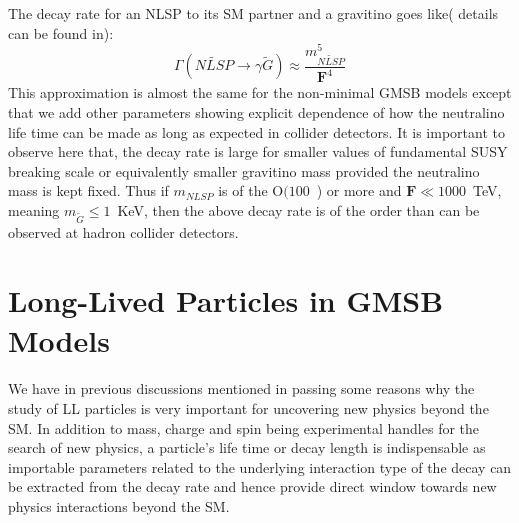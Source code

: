 {The decay rate for an NLSP to its SM partner and a gravitino goes like( details can be found in\cite{SM,GU}):
\begin{equation}\label{drate}
\Gamma(\tilde{NLSP} \rightarrow \gamma\tilde{G}) \approx  \frac{m^{5}_{\tilde{NLSP}}}{\mathbf{F}^{4}}
\end{equation}
This approximation is almost the same for the non-minimal GMSB models except that we add other parameters showing explicit dependence of how the neutralino life time can be made as long as expected in collider detectors.
It is important to observe here that, the decay rate is large for smaller values of fundamental SUSY breaking scale or equivalently smaller gravitino mass provided the neutralino mass is kept fixed. Thus if $m_{NLSP}$ is of the $\mathrm{O}(100$~\GeV) or more and $\mathbf{F} \ll 1000$~TeV, meaning $m_{\tilde{G}} \leq 1$~KeV, then the above decay rate is of the order than can be observed at hadron collider detectors.




\section{Long-Lived Particles in GMSB Models}
\paragraph*{}
We have in previous discussions mentioned in passing some reasons why the study of LL particles is very important for uncovering new physics beyond the SM. In addition to mass, charge and spin being experimental handles for the search of new physics, a particle's life time or decay length is indispensable as importable parameters related to the underlying interaction type of the decay can be extracted from the decay rate and hence provide direct window towards new physics interactions beyond the SM.
}
